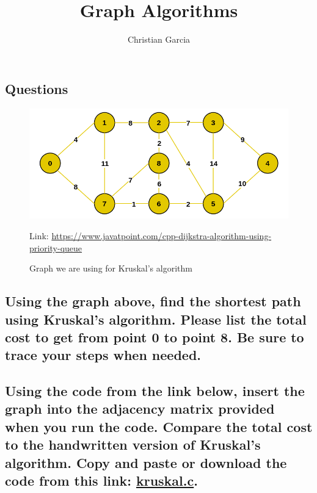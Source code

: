 \documentclass{article}
\title{Graph Algorithms}
\author{Christian Garcia}
\begin{document}
\maketitle


\begin{Huge}
\section*{Questions}
\end{Huge}

\begin{figure}[!h]
\includegraphics[width=\linewidth]{kruskalgraph.png}
\caption{Graph we are using for Kruskal's algorithm} Link: \href{https://www.javatpoint.com/cpp-dijkstra-algorithm-using-priority-queue}{https://www.javatpoint.com/cpp-dijkstra-algorithm-using-priority-queue}
\end{figure}

\subsection{Using the graph above, find the shortest path using Kruskal's algorithm. Please list the total cost to get from point 0 to point 8. Be sure to trace your steps when needed. }

\pagebreak{}

\subsection{Using the code from the link below, insert the graph into the adjacency matrix provided when you run the code. Compare the total cost to the handwritten version of Kruskal's algorithm. Copy and paste or download the code from this link: \href{https://github.com/ehawkvu/ds-n-a/blob/master/graphing/kruskal.c}{kruskal.c}.}

\vspace{36pt}
\end{document}
